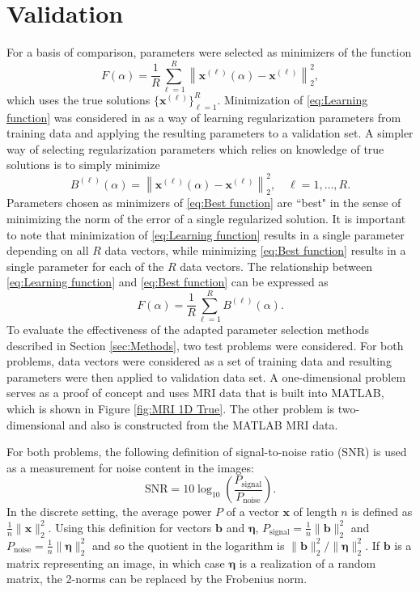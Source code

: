 \documentclass[12pt]{article}
\newcommand{\bVec}{\mathbf{b}}	%
\newcommand{\xVec}{\mathbf{x}}	%
\newcommand{\regparam}{\alpha}
\newcommand{\noise}{\eta}	%
\newcommand{\noiseVec}{\bm{\noise}}	%
\begin{document}
\section{Validation} \label{sec:Validation}
For a basis of comparison, parameters were selected as minimizers of the function
\begin{equation}
\label{eq:Learning function}
F(\regparam) = \frac{1}{R}\sum_{\ell=1}^R \left\|\xVec^{(\ell)}(\regparam) - \xVec^{(\ell)}\right\|_2^2,
\end{equation} 
which uses the true solutions $\{\xVec^{(\ell)}\}_{\ell=1}^R$. Minimization of \eqref{eq:Learning function} was considered in \cite{ChungEspanol2017} as a way of learning regularization parameters from training data and applying the resulting parameters to a validation set. A simpler way of selecting regularization parameters which relies on knowledge of true solutions is to simply minimize
\begin{equation}
\label{eq:Best function}
B^{(\ell)}(\regparam) = \left\|\xVec^{(\ell)}(\regparam) - \xVec^{(\ell)}\right\|_2^2, \quad \ell = 1,\ldots,R.
\end{equation}
Parameters chosen as minimizers of \eqref{eq:Best function} are ``best" in the sense of minimizing the norm of the error of a single regularized solution. It is important to note that minimization of \eqref{eq:Learning function} results in a single parameter depending on all $R$ data vectors, while minimizing \eqref{eq:Best function} results in a single parameter for each of the $R$ data vectors. The relationship between \eqref{eq:Learning function} and \eqref{eq:Best function} can be expressed as
\[F(\regparam) = \frac{1}{R}\sum_{\ell=1}^R B^{(\ell)}(\regparam).\]
\indent To evaluate the effectiveness of the adapted parameter selection methods described in Section \ref{sec:Methods}, two test problems were considered. For both problems, data vectors were considered as a set of training data and resulting parameters were then applied to validation data set. A one-dimensional problem serves as a proof of concept and uses MRI data that is built into MATLAB, which is shown in Figure \ref{fig:MRI 1D True}. The other problem is two-dimensional and also is constructed from the MATLAB MRI data. \par
For both problems, the following definition of signal-to-noise ratio (SNR) is used as a measurement for noise content in the images:
\begin{equation}
\label{eq:SNR}
\text{SNR} = 10\log_{10}\left(\frac{P_{\text{signal}}}{P_{\text{noise}}}\right).
\end{equation}
In the discrete setting, the average power $P$ of a vector $\xVec$ of length $n$ is defined as $\frac{1}{n}\|\xVec\|^2_2$. Using this definition for vectors $\bVec$ and $\noiseVec$, $P_{\text{signal}} = \frac{1}{n}\|\bVec\|^2_2$ and $P_{\text{noise}} = \frac{1}{n}\|\noiseVec\|^2_2$ and so the quotient in the logarithm is $\|\bVec\|_2^2/\|\noiseVec\|_2^2$. If $\bVec$ is a matrix representing an image, in which case $\noiseVec$ is a realization of a random matrix, the 2-norms can be replaced by the Frobenius norm.
\end{document}
